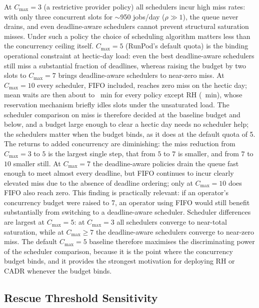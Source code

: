 {At $C_{\max}=3$ (a restrictive provider policy) all schedulers incur high miss rates: with only three concurrent slots for $\sim$950 jobs/day ($\rho \gg 1$), the queue never drains, and even deadline-aware schedulers cannot prevent structural saturation misses. Under such a policy the choice of scheduling algorithm matters less than the concurrency ceiling itself. $C_{\max}=5$ (RunPod's default quota) is the binding operational constraint at hectic-day load: even the best deadline-aware schedulers still miss a substantial fraction of deadlines, whereas raising the budget by two slots to $C_{\max}=7$ brings deadline-aware schedulers to near-zero miss. At $C_{\max}=10$ every scheduler, FIFO included, reaches zero miss on the hectic day; mean waits are then about \CmaxTenOtherWaitLo{} to \CmaxTenOtherWaitHi~min for every policy except RH (\CmaxTenRHwait~min), whose reservation mechanism briefly idles slots under the unsaturated load. The scheduler comparison on miss is therefore decided at the baseline budget and below, and a budget large enough to clear a hectic day needs no scheduler help; the schedulers matter when the budget binds, as it does at the default quota of 5. The returns to added concurrency are diminishing: the miss reduction from $C_{\max}=3$ to $5$ is the largest single step, that from $5$ to $7$ is smaller, and from $7$ to $10$ smaller still. At $C_{\max}=7$ the deadline-aware policies drain the queue fast enough to meet almost every deadline, but FIFO continues to incur clearly elevated miss due to the absence of deadline ordering; only at $C_{\max}=10$ does FIFO also reach zero. This finding is practically relevant: if an operator's concurrency budget were raised to 7, an operator using FIFO would still benefit substantially from switching to a deadline-aware scheduler. Scheduler differences are largest at $C_{\max}=5$: at $C_{\max}=3$ all schedulers converge to near-total saturation, while at $C_{\max} \geq 7$ the deadline-aware schedulers converge to near-zero miss. The default $C_{\max}=5$ baseline therefore maximises the discriminating power of the scheduler comparison, because it is the point where the concurrency budget binds, and it provides the strongest motivation for deploying RH or CADR whenever the budget binds.

\subsection{Rescue Threshold Sensitivity}
\label{ssec:rescue-threshold-sensitivity}

}
